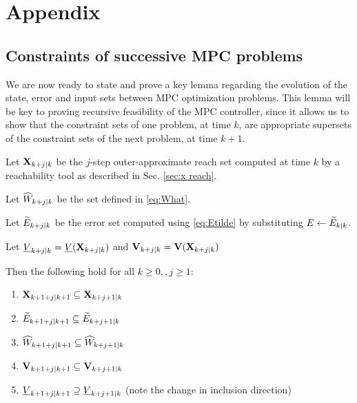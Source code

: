 \section*{Appendix}

\subsection{Constraints of successive MPC problems}
\label{sec:inclusions statement}
We are now ready to state and prove a key lemma regarding the evolution of the state, error and input sets between MPC optimization problems. 
This lemma will be key to proving recursive feasibility of the MPC controller, since it allows us to show that the constraint sets of one problem, at time $k$, are appropriate supersets of the constraint sets of the next problem, at time $k+1$. 

\begin{lemma}
	\label{lem:set inclusions}
	Let $\mathbf{X}_{k+j|k}$ be the $j$-step outer-approximate reach set computed at time $k$ by a reachability tool as described in Sec. \ref{sec:x reach}.
	
	Let $\widehat{W}_{k+j|k}$ be the set defined in \eqref{eq:What}.
	
	Let $\widetilde{E}_{k+j|k}$ be the error set computed using \eqref{eq:Etilde} by substituting $E \leftarrow \widetilde{E}_{k|k}$.
	
	Let $\underline{V}_{k+j|k} = \underline{V}(\mathbf{X}_{k+j|k})$ and $\mathbf{V}_{k+j|k} = \mathbf{V}(\mathbf{X}_{k+j|k})$ 

Then the following hold for all $k \geq 0, ,j \geq 1$:
\begin{enumerate}
	\item $\mathbf{X}_{k+1+j|k+1} \subseteq \mathbf{X}_{k+j+1|k}$
	\label{set:X}
	\item $\widetilde{E}_{k+1+j|k+1} \subseteq \widetilde{E}_{k+j+1|k}$
	\label{set:tE}
	\item $\widehat{W}_{k+1+j|k+1} \subseteq \widehat{W}_{k+j+1|k}$
	\label{set:What}
	\item $\mathbf{V}_{k+1+j|k+1} \subseteq \mathbf{V}_{k+j+1|k}$
	\label{set:oaV}
	\item $\underline{V}_{k+1+j|k+1} \supseteq \underline{V}_{k+j+1|k}$ (note the change in inclusion direction)
	\label{set:uaV}		
\end{enumerate} 
\end{lemma} 

